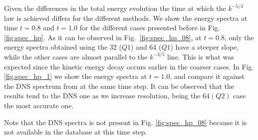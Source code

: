 Given the differences in the total energy evolution the time at which the $k^{-5/3}$ law is achieved differs for the different methods. We show the energy spectra at time $t=0.8$ and $t=1.0$ for the different cases presented before in Fig. \ref{fig:spec_hp}. As it can be observed in Fig.~\ref{fig:spec_hp_08}, at $t=0.8$, only the energy spectra obtained using the 32 ($Q1$) and  64 ($Q1$) have a steeper slope, while the other cases are almost parallel to the $k^{-3/5}$ line. This is what was expected since the kinetic energy decay occurs earlier in the coarser cases.
In Fig. \ref{fig:spec_hp_1} we show the energy spectra at $t=1.0$, and compare it against the DNS spectrum from \cite{_selection_????} at the same time step. It can be observed that the results tend to the DNS one as we increase resolution, being the $64(Q2)$ case the most accurate one.

Note that the DNS spectra is not present in Fig. \ref{fig:spec_hp_08} because it is not available in the database \cite{_selection_????} at this time step.


